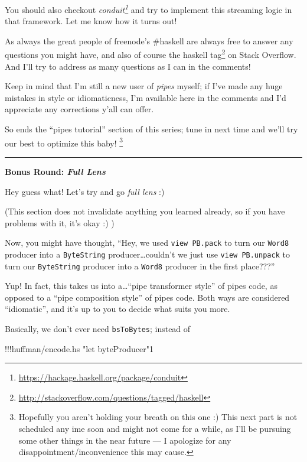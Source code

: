 \documentclass[]{article}
\newenvironment{Shaded}{}{}
\newcommand{\DecValTok}[1]{\textcolor[rgb]{0.25,0.63,0.44}{{#1}}}
\newcommand{\StringTok}[1]{\textcolor[rgb]{0.25,0.44,0.63}{{#1}}}
\newcommand{\FunctionTok}[1]{\textcolor[rgb]{0.02,0.16,0.49}{{#1}}}
\newcommand{\NormalTok}[1]{{#1}}
\renewcommand{\href}[2]{#2\footnote{\url{#1}}}
\begin{document}
You should also checkout
\emph{\href{https://hackage.haskell.org/package/conduit}{conduit}} and
try to implement this streaming logic in that framework. Let me know how
it turns out!

As always the great people of freenode's \#haskell are always free to
answer any questions you might have, and also of course the
\href{http://stackoverflow.com/questions/tagged/haskell}{haskell tag} on
Stack Overflow. And I'll try to address as many questions as I can in
the comments!

Keep in mind that I'm still a new user of \emph{pipes} myself; if I've
made any huge mistakes in style or idiomaticness, I'm available here in
the comments and I'd appreciate any corrections y'all can offer.

So ends the ``pipes tutorial'' section of this series; tune in next time
and we'll try our best to optimize this baby! \footnote{Hopefully you
  aren't holding your breath on this one :) This next part is not
  scheduled any ime soon and might not come for a while, as I'll be
  pursuing some other things in the near future --- I apologize for any
  disappointment/inconvenience this may cause.}

\begin{center}\rule{0.5\linewidth}{\linethickness}\end{center}

\textbf{Bonus Round: \emph{Full Lens}}

Hey guess what! Let's try and go \emph{full lens} :)

(This section does not invalidate anything you learned already, so if
you have problems with it, it's okay :) )

Now, you might have thought, ``Hey, we used \texttt{view\ PB.pack} to
turn our \texttt{Word8} producer into a \texttt{ByteString}
producer\ldots{}couldn't we just use \texttt{view\ PB.unpack} to turn
our \texttt{ByteString} producer into a \texttt{Word8} producer in the
first place???''

Yup! In fact, this takes us into a\ldots{}``pipe transformer style'' of
pipes code, as opposed to a ``pipe composition style'' of pipes code.
Both ways are considered ``idiomatic'', and it's up to you to decide
what suits you more.

Basically, we don't ever need \texttt{bsToBytes}; instead of

\begin{Shaded}
\begin{Highlighting}[]
\FunctionTok{!!!}\NormalTok{huffman}\FunctionTok{/}\NormalTok{encode}\FunctionTok{.}\NormalTok{hs }\StringTok{"let byteProducer"}\DecValTok{1}
\end{Highlighting}
\end{Shaded}
\end{document}
